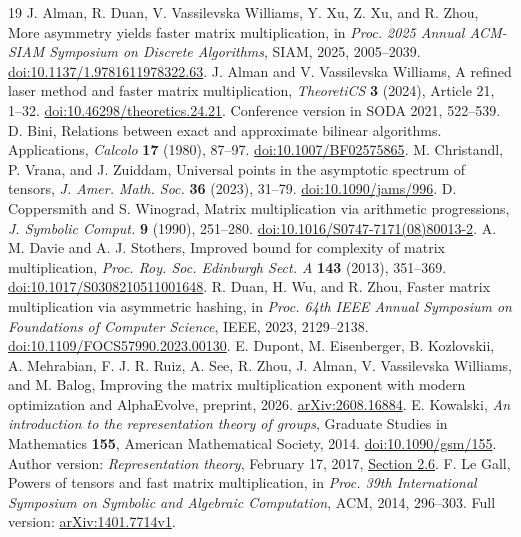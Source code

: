 \begin{thebibliography}{19}
 J. Alman, R. Duan, V. Vassilevska Williams, Y. Xu, Z. Xu, and R. Zhou, More asymmetry yields faster matrix multiplication, in \emph{Proc. 2025 Annual ACM-SIAM Symposium on Discrete Algorithms}, SIAM, 2025, 2005--2039. \href{https://doi.org/10.1137/1.9781611978322.63}{doi:10.1137/1.9781611978322.63}.
 J. Alman and V. Vassilevska Williams, A refined laser method and faster matrix multiplication, \emph{TheoretiCS} \textbf{3} (2024), Article 21, 1--32. \href{https://doi.org/10.46298/theoretics.24.21}{doi:10.46298/theoretics.24.21}. Conference version in SODA 2021, 522--539.
 D. Bini, Relations between exact and approximate bilinear algorithms. Applications, \emph{Calcolo} \textbf{17} (1980), 87--97. \href{https://doi.org/10.1007/BF02575865}{doi:10.1007/BF02575865}.
 M. Christandl, P. Vrana, and J. Zuiddam, Universal points in the asymptotic spectrum of tensors, \emph{J. Amer. Math. Soc.} \textbf{36} (2023), 31--79. \href{https://doi.org/10.1090/jams/996}{doi:10.1090/jams/996}.
 D. Coppersmith and S. Winograd, Matrix multiplication via arithmetic progressions, \emph{J. Symbolic Comput.} \textbf{9} (1990), 251--280. \href{https://doi.org/10.1016/S0747-7171(08)80013-2}{doi:10.1016/S0747-7171(08)80013-2}.
 A. M. Davie and A. J. Stothers, Improved bound for complexity of matrix multiplication, \emph{Proc. Roy. Soc. Edinburgh Sect. A} \textbf{143} (2013), 351--369. \href{https://doi.org/10.1017/S0308210511001648}{doi:10.1017/S0308210511001648}.
 R. Duan, H. Wu, and R. Zhou, Faster matrix multiplication via asymmetric hashing, in \emph{Proc. 64th IEEE Annual Symposium on Foundations of Computer Science}, IEEE, 2023, 2129--2138. \href{https://doi.org/10.1109/FOCS57990.2023.00130}{doi:10.1109/FOCS57990.2023.00130}.
 E. Dupont, M. Eisenberger, B. Kozlovskii, A. Mehrabian, F. J. R. Ruiz, A. See, R. Zhou, J. Alman, V. Vassilevska Williams, and M. Balog, Improving the matrix multiplication exponent with modern optimization and AlphaEvolve, preprint, 2026. \href{https://arxiv.org/abs/2608.16884}{arXiv:2608.16884}.
 E. Kowalski, \emph{An introduction to the representation theory of groups}, Graduate Studies in Mathematics \textbf{155}, American Mathematical Society, 2014. \href{https://doi.org/10.1090/gsm/155}{doi:10.1090/gsm/155}. Author version: \emph{Representation theory}, February 17, 2017, \href{https://people.math.ethz.ch/~kowalski/representation-theory.pdf}{Section 2.6}.
 F. Le Gall, Powers of tensors and fast matrix multiplication, in \emph{Proc. 39th International Symposium on Symbolic and Algebraic Computation}, ACM, 2014, 296--303. Full version: \href{https://arxiv.org/abs/1401.7714v1}{arXiv:1401.7714v1}.

\end{thebibliography}
